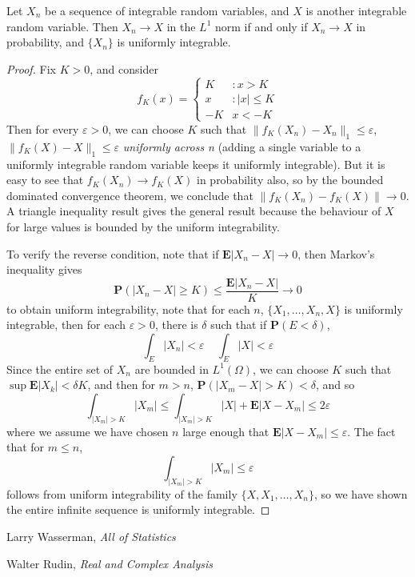 \begin{theorem}
    Let $X_n$ be a sequence of integrable random variables, and $X$ is another integrable random variable. Then $X_n \to X$ in the $L^1$ norm if and only if $X_n \to X$ in probability, and $\{ X_n \}$ is uniformly integrable.
\end{theorem}
\begin{proof}
    Fix $K > 0$, and consider
    \[ f_K(x) = \begin{cases} K &: x > K \\ x & :|x| \leq K\\ -K & x < -K \end{cases} \]
    Then for every $\varepsilon > 0$, we can choose $K$ such that $\| f_K(X_n) - X_n \|_1 \leq \varepsilon$, $\| f_K(X) - X \|_1 \leq \varepsilon$ {\it uniformly across n} (adding a single variable to a uniformly integrable random variable keeps it uniformly integrable). But it is easy to see that $f_K(X_n) \to f_K(X)$ in probability also, so by the bounded dominated convergence theorem, we conclude that $\| f_K(X_n) - f_K(X) \| \to 0$. A triangle inequality result gives the general result because the behaviour of $X$ for large values is bounded by the uniform integrability.

    To verify the reverse condition, note that if $\mathbf{E}|X_n - X| \to 0$, then Markov's inequality gives
    \[ \mathbf{P}(|X_n - X| \geq K) \leq \frac{\mathbf{E}|X_n - X|}{K} \to 0 \]
    to obtain uniform integrability, note that for each $n$, $\{ X_1, \dots, X_n, X \}$ is uniformly integrable, then for each $\varepsilon > 0$, there is $\delta$ such that if $\mathbf{P}(E < \delta)$,
    \[ \int_E |X_n| < \varepsilon\ \ \ \ \ \int_E |X| < \varepsilon \]
    Since the entire set of $X_n$ are bounded in $L^1(\Omega)$, we can choose $K$ such that $\sup \mathbf{E} |X_k| < \delta K$, and then for $m > n$, $\mathbf{P}(|X_m - X| > K) < \delta$, and so
    \[ \int_{|X_m| > K} |X_m| \leq \int_{|X_m| > K} |X| + \mathbf{E}|X - X_m| \leq 2\varepsilon \]
    where we assume we have chosen $n$ large enough that $\mathbf{E}|X - X_m| \leq \varepsilon$. The fact that for $m \leq n$,
    \[ \int_{|X_m| > K} |X_m| \leq \varepsilon \]
    follows from uniform integrability of the family $\{ X, X_1, \dots, X_n \}$, so we have shown the entire infinite sequence is uniformly integrable.
\end{proof}


\begin{thebibliography}{10}
     Larry Wasserman,
    \emph{All of Statistics}

     Walter Rudin,
    \emph{Real and Complex Analysis}
\end{thebibliography}



